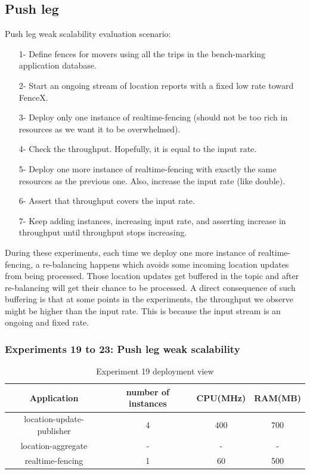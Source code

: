 \documentclass[a4]{report}
\begin{document}
    \subsection{Push leg}
    Push leg weak scalability evaluation scenario:
    \begin{itemize}
        \item[1-] Define fences for movers using all the trips in the bench-marking application database.
        \item[2-] Start an ongoing stream of location reports with a fixed low rate toward FenceX.
        \item[3-] Deploy only one instance of realtime-fencing (should not be too rich in resources as we want it to be overwhelmed).
        \item[4-] Check the throughput.
        Hopefully, it is equal to the input rate.
        \item[5-] Deploy one more instance of realtime-fencing with exactly the same resources as the previous one. Also,
        increase the input rate (like double).
        \item[6-] Assert that throughput covers the input rate.
        \item[7-] Keep adding instances, increasing input rate, and asserting increase in throughput until throughput stops increasing.
    \end{itemize}

    During these experiments, each time we deploy one more instance of realtime-fencing, a re-balancing happens which
    avoids some incoming location updates from being processed.
    Those location updates get buffered in the topic and after re-balancing will get their chance to be processed.
    A direct consequence of such buffering is that at some points in the experiments, the throughput we observe might be higher than the input rate.
    This is because the input stream is an ongoing and fixed rate.

    \subsubsection{Experiments 19 to 23: Push leg weak scalability}
    \begin{table}[h!]
        \centering
        \begin{tabular}{|c|c|c|c|}
            \hline
            Application               & number of instances & CPU(MHz) & RAM(MB) \\
            \hline
            location-update-publisher & 4                   & 400      & 700     \\
            location-aggregate        & -                   & -        & -       \\
            realtime-fencing          & 1                   & 60       & 500     \\
            \hline
        \end{tabular}
        \caption{Experiment 19 deployment view}
        \label{table:ex19-dv}
    \end{table}
\end{document}
